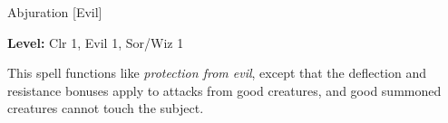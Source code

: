
Abjuration [Evil]

\textbf{Level:} Clr 1, Evil 1, Sor/Wiz 1

This spell functions like \textit{protection from evil}, except that the deflection 
and resistance bonuses apply to attacks from good creatures, and good summoned 
creatures cannot touch the subject.

